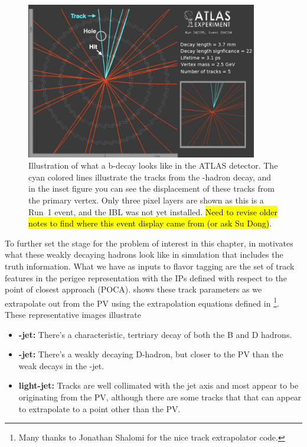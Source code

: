 \begin{figure}[htbp]
  \centering
  \includegraphics[width=0.9\textwidth]{figures/ftag/b-decay-evt-display-annotated}
  \caption{Illustration of what a b-decay looks like in the ATLAS detector. 
  The cyan colored lines illustrate the tracks from the \Pqb-hadron decay, and in the inset figure you can see the displacement of these tracks from the primary vertex. 
  Only three pixel layers are shown as this is a Run~1 event, and the IBL was not yet installed. \hl{Need to revise older notes to find where this event display came from (or ask Su Dong)}. }
  \label{fig:b-jet-graphic}
\end{figure}

To further set the stage for the problem of interest in this chapter, in \Fig{\ref{fig::jet-displays}} motivates what these weakly decaying hadrons look like in simulation that includes the truth information.
What we have as inputs to flavor tagging are the set of track features in the perigee representation with the IPs defined with respect to the point of closest approach (POCA). \Fig{\ref{fig::jet-displays}} shows these track parameters as we extrapolate out from the PV using the extrapolation equations defined in \Sect{\ref{sec:vertexing}}\footnote{Many thanks to Jonathan Shalomi for the nice track extrapolator code.}.
These representative images illustrate 
\begin{itemize}
	\item \textbf{\Pqb-jet:} There's a characteristic, tertriary decay of both the B and D hadrons.
	\item \textbf{\Pqc-jet:} There's a weakly decaying D-hadron, but closer to the PV than the weak decays in the \Pqb-jet.
	\item \textbf{light-jet:} Tracks are well collimated with the jet axis and most appear to be originating from the PV, although there are some tracks that that can appear to extrapolate to a point other than the PV.
\end{itemize}

